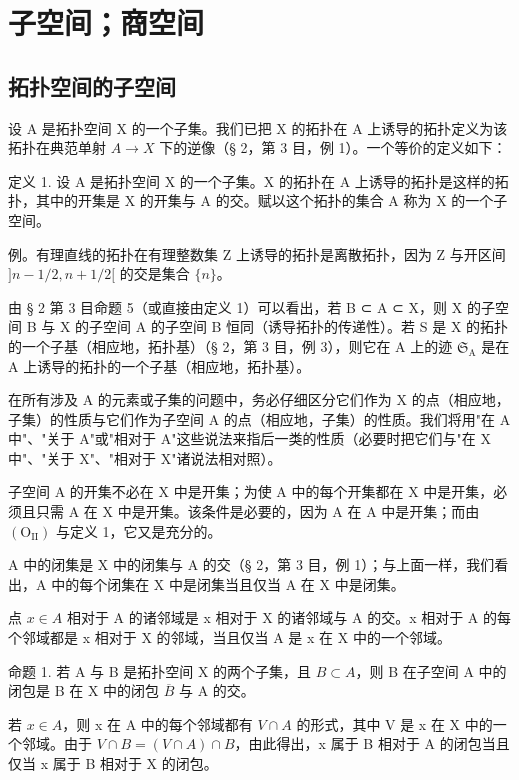 \section{子空间；商空间}

\subsection{拓扑空间的子空间}

设 A 是拓扑空间 X 的一个子集。我们已把 X 的拓扑在 A 上诱导的拓扑定义为该拓扑在典范单射 \(A \rightarrow X\) 下的逆像（§ 2，第 3 目，例 1）。一个等价的定义如下：

定义 1. 设 A 是拓扑空间 X 的一个子集。X 的拓扑在 A 上诱导的拓扑是这样的拓扑，其中的开集是 X 的开集与 A 的交。赋以这个拓扑的集合 A 称为 X 的一个子空间。

例。有理直线的拓扑在有理整数集 Z 上诱导的拓扑是离散拓扑，因为 Z 与开区间 \(]n - 1/2, n + 1/2[\) 的交是集合 \(\{n\}\)。

由 § 2 第 3 目命题 5（或直接由定义 1）可以看出，若 B ⊂ A ⊂ X，则 X 的子空间 B 与 X 的子空间 A 的子空间 B 恒同（诱导拓扑的传递性）。若 S 是 X 的拓扑的一个子基（相应地，拓扑基）（§ 2，第 3 目，例 3），则它在 A 上的迹 \(\mathfrak{S}_{\mathrm{A}}\) 是在 A 上诱导的拓扑的一个子基（相应地，拓扑基）。

在所有涉及 A 的元素或子集的问题中，务必仔细区分它们作为 X 的点（相应地，子集）的性质与它们作为子空间 A 的点（相应地，子集）的性质。我们将用"在 A 中"、"关于 A"或"相对于 A"这些说法来指后一类的性质（必要时把它们与"在 X 中"、"关于 X"、"相对于 X"诸说法相对照）。

子空间 A 的开集不必在 X 中是开集；为使 A 中的每个开集都在 X 中是开集，必须且只需 A 在 X 中是开集。该条件是必要的，因为 A 在 A 中是开集；而由 \((\mathrm{O}_{\mathrm{II}})\) 与定义 1，它又是充分的。

A 中的闭集是 X 中的闭集与 A 的交（§ 2，第 3 目，例 1）；与上面一样，我们看出，A 中的每个闭集在 X 中是闭集当且仅当 A 在 X 中是闭集。

点 \(x \in A\) 相对于 A 的诸邻域是 x 相对于 X 的诸邻域与 A 的交。x 相对于 A 的每个邻域都是 x 相对于 X 的邻域，当且仅当 A 是 x 在 X 中的一个邻域。

命题 1. 若 A 与 B 是拓扑空间 X 的两个子集，且 \(B \subset A\)，则 B 在子空间 A 中的闭包是 B 在 X 中的闭包 \(\overline{B}\) 与 A 的交。

若 \(x \in A\)，则 x 在 A 中的每个邻域都有 \(V \cap A\) 的形式，其中 V 是 x 在 X 中的一个邻域。由于 \(V \cap B = (V \cap A) \cap B\)，由此得出，x 属于 B 相对于 A 的闭包当且仅当 x 属于 B 相对于 X 的闭包。

